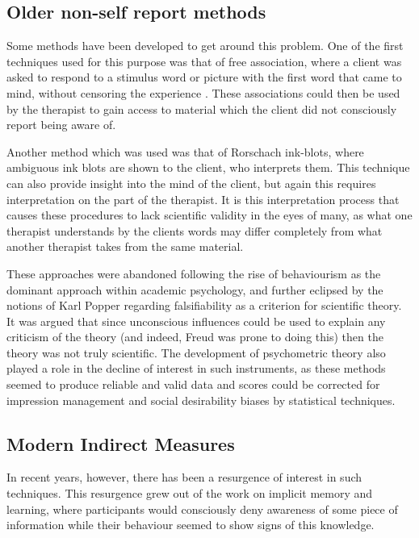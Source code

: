 \subsection{Older non-self report methods}
\label{sec:older-non-self}

Some methods have been developed to get around this problem. One of the first techniques used for this purpose was that of free association, where a client was asked to respond to a stimulus word or picture with the first word that came to mind, without censoring the experience \cite{Hofmann2008}. These associations could then be used by the therapist to gain access to material which the client did not consciously report being aware of. 

Another method which was used was that of Rorschach ink-blots, where ambiguous ink blots are shown to the client, who interprets them. This technique can also provide insight into the mind of the client, but again this requires interpretation on the part of the therapist. It is this interpretation process that causes these procedures to lack scientific validity in the eyes of many, as what one therapist understands by the clients words may differ completely from what another therapist takes from the same material. 

These approaches were abandoned following the rise of behaviourism as the dominant approach within academic psychology, and further eclipsed by the notions of Karl Popper regarding falsifiability as a criterion for scientific theory. It was argued that since unconscious influences could be used to explain any criticism of the theory (and indeed, Freud was prone to doing this) then the theory was not truly scientific. The development of psychometric theory also played a role in the decline of interest in such instruments, as these methods seemed to produce reliable and valid data and scores could be corrected for impression management and social desirability biases by statistical techniques. 

\subsection{Modern Indirect Measures}
\label{sec:turn-back-indirect}
In recent years, however, there has been a resurgence of interest in such techniques. This resurgence grew out of the work on implicit memory and learning, where participants would consciously deny awareness of some piece of information while their behaviour seemed to show signs of this knowledge.  

